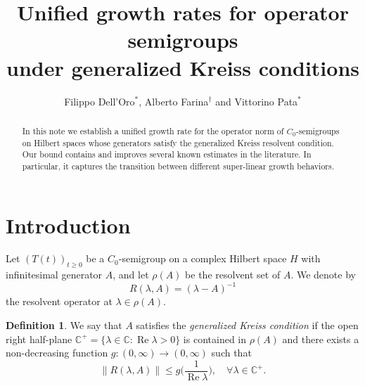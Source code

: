 \documentclass[12pt]{amsart}
\theoremstyle{plain}
\theoremstyle{definition}
\newtheorem{definition}[theorem]{Definition}
\numberwithin{equation}{section}
\def\C {\mathbb{C}}
\newcommand{\T}{(T(t))_{t\ge 0}}
\DeclareMathOperator*{\re}{Re}
\begin{document}
\title[Growth rates for operator semigroups]
{Unified growth rates for operator semigroups\\ under generalized Kreiss conditions}

\author[F. Dell'Oro, A. Farina, V. Pata]
{Filippo Dell'Oro$^*$, Alberto Farina$^\dag$ and Vittorino Pata$^*$}

\address{$^*$Politecnico di Milano - Dipartimento di Matematica
\newline\indent
Via Bonardi 9, 20133 Milano, Italy}

\address{$^\dag$Université de Picardie Jules Verne - LAMFA
\newline\indent
CNRS UMR 7352, 33, Rue Saint-Leu 80039 Amiens, France}


\begin{abstract}
In this note we establish a unified growth rate for the operator norm of $C_0$-semigroups on Hilbert spaces
whose generators satisfy the generalized Kreiss resolvent condition.
Our bound contains and improves several known estimates in the literature. In particular, it
captures the transition between different super-linear growth behaviors.
\end{abstract}

\maketitle


\section{Introduction}

\noindent
Let $\T$ be a $C_0$-semigroup on a complex Hilbert space $H$ with infinitesimal generator $A$,
and let $\rho(A)$ be the resolvent set of $A$. We denote by
$$R(\lambda,A)=(\lambda- A)^{-1}$$
the resolvent operator at $\lambda\in\rho(A)$.

\begin{definition}
We say that $A$ satisfies the \emph{generalized Kreiss condition} if the open right half-plane
$\C^{+} = \{ \lambda \in \C : \re \lambda > 0\}$
is contained in $\rho(A)$ and there exists a non-decreasing function $g:(0,\infty)\to (0,\infty)$
such that
\begin{equation}
\label{gen-kreiss}
\|R(\lambda,A)\|\leq g \Big(\frac{1}{\re \lambda}\Big),\quad\forall \lambda \in \C^{+}.
\end{equation}
\end{definition}
\end{document}
